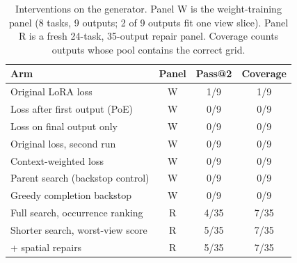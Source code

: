 \begin{table}[t]\centering\footnotesize
\caption{Interventions on the generator. Panel W is the weight-training panel (8 tasks, 9 outputs; 2 of 9 outputs fit one view slice). Panel R is a fresh 24-task, 35-output repair panel. Coverage counts outputs whose pool contains the correct grid.}\label{tab:generator}
\setlength{\tabcolsep}{3.5pt}\begin{tabular}{lccc}\toprule
Arm & Panel & Pass@2 & Coverage \\\midrule
Original LoRA loss & W & 1/9 & 1/9 \\
Loss after first output (PoE) & W & 0/9 & 0/9 \\
Loss on final output only & W & 0/9 & 0/9 \\
Original loss, second run & W & 0/9 & 0/9 \\
Context-weighted loss & W & 0/9 & 0/9 \\
Parent search (backstop control) & W & 0/9 & 0/9 \\
Greedy completion backstop & W & 0/9 & 0/9 \\
\midrule
Full search, occurrence ranking & R & 4/35 & 7/35 \\
Shorter search, worst-view score & R & 5/35 & 7/35 \\
\quad + spatial repairs & R & 5/35 & 7/35 \\
\bottomrule\end{tabular}\end{table}
